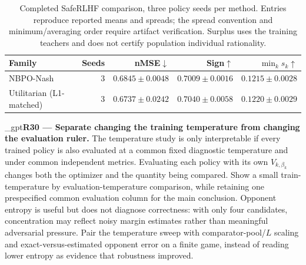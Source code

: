 \documentclass{article}
\newif\ifshowreviews
\newcommand{\reviewresponse}[1]{%
  \ifshowreviews
  \par\begingroup\color{blue!65!black}\hypersetup{allcolors=blue!65!black}\emergencystretch=2em%
  \noindent\textbf{Response:} #1\par\endgroup
  \fi}
\theoremstyle{remark}
\theoremstyle{plain}
\begin{document}
\begin{table}[t]
\centering\small
\setlength{\tabcolsep}{5pt}
\caption{Completed SafeRLHF comparison, three policy seeds per method. Entries reproduce reported means and spreads; the spread convention and minimum/averaging order require artifact verification. Surplus uses the training teachers and does not certify population individual rationality.}
\label{tab:saferlhf-main}
\begin{tabular}{lrrrr}
\toprule
Family & Seeds & nMSE$\downarrow$ & Sign$\uparrow$ & $\min_k s_k\uparrow$\\
\midrule
NBPO-Nash & $3$ & $0.6845\pm0.0048$ & $0.7009\pm0.0016$ & $0.1215\pm0.0028$\\
Utilitarian (L1-matched) & $3$ & $0.6737\pm0.0242$ & $0.7040\pm0.0058$ & $0.1220\pm0.0029$\\
\bottomrule
\end{tabular}
\end{table}



\kekim_gpt{\textbf{R30 --- Separate changing the training temperature from changing the evaluation ruler.} The temperature study is only interpretable if every trained policy is also evaluated at a common fixed diagnostic temperature and under common independent metrics. Evaluating each policy with its own $V_{k,\beta_k}$ changes both the optimizer and the quantity being compared. Show a small train-temperature by evaluation-temperature comparison, while retaining one prespecified common evaluation column for the main conclusion. Opponent entropy is useful but does not diagnose correctness: with only four candidates, concentration may reflect noisy margin estimates rather than meaningful adversarial pressure. Pair the temperature sweep with comparator-pool/$L$ scaling and exact-versus-estimated opponent error on a finite game, instead of reading lower entropy as evidence that robustness improved.}
\reviewresponse{\textbf{R30 --- Partially addressed.} The evaluation contract now fixes the evaluator, comparator bank, and diagnostic temperatures within each panel regardless of training temperature. A controlled temperature study is described, but a train-temperature by evaluation-temperature matrix and exact-versus-estimated opponent errors across sampling and pool sizes are not documented as completed.}
\end{document}
